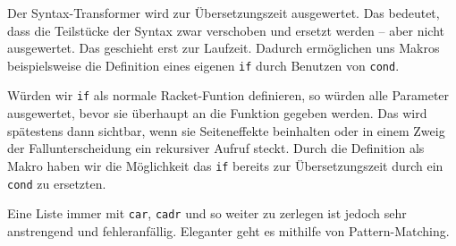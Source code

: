 Der Syntax-Transformer wird zur Übersetzungszeit ausgewertet. Das bedeutet, dass die Teilstücke der Syntax zwar verschoben und ersetzt werden -- aber nicht ausgewertet. Das geschieht erst zur Laufzeit. Dadurch ermöglichen uns Makros beispielsweise die Definition eines eigenen \texttt{if} durch Benutzen von \texttt{cond}.

Würden wir \texttt{if} als normale Racket-Funtion definieren, so würden alle Parameter ausgewertet, bevor sie überhaupt an die Funktion gegeben werden. Das wird spätestens dann sichtbar, wenn sie Seiteneffekte beinhalten oder in einem Zweig der Fallunterscheidung ein rekursiver Aufruf steckt. Durch die Definition als Makro haben wir die Möglichkeit das \texttt{if} bereits zur Übersetzungszeit durch ein \texttt{cond} zu ersetzten.

% 

Eine Liste immer mit \texttt{car}, \texttt{cadr} und so weiter zu zerlegen ist jedoch sehr anstrengend und fehleranfällig. Eleganter geht es mithilfe von Pattern-Matching. %

% 
% 
% 
% 
% 
%   

